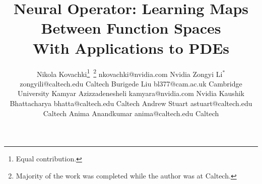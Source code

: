 \documentclass[twoside,12pt]{ctexart}
\newcommand{\kamyar}[1]{\textcolor{red}{Kamyar:~#1}}
\begin{document}
\title{
Neural Operator: Learning Maps Between Function Spaces \\ With Applications to PDEs
}



\renewcommand{\thefootnote}{\fnsymbol {footnote}}

\author{\name Nikola Kovachki\thanks{Equal contribution.} \,\thanks{Majority of the work was completed while the author was at Caltech.} \email nkovachki@nvidia.com \addr Nvidia
\AND \name Zongyi Li$^*$ \email zongyili@caltech.edu \addr Caltech
\AND \name Burigede Liu \email bl377@cam.ac.uk \addr Cambridge University
\AND \name Kamyar Azizzadenesheli \email kamyara@nvidia.com \addr  Nvidia
\AND \name Kaushik Bhattacharya \email bhatta@caltech.edu \addr Caltech
\AND \name Andrew Stuart \email astuart@caltech.edu \addr Caltech
\AND \name Anima Anandkumar \email anima@caltech.edu \addr Caltech
}


%

\end{document}
